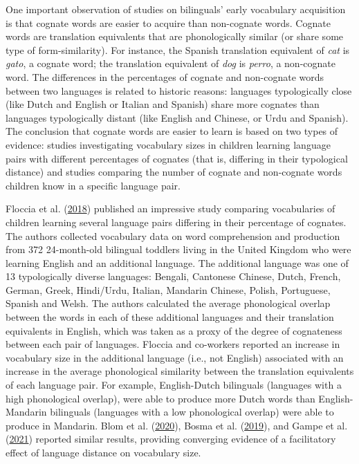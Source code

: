 \documentclass[
]{article}
\begin{document}
One important observation of studies on bilinguals' early vocabulary
acquisition is that cognate words are easier to acquire than non-cognate
words. Cognate words are translation equivalents that are phonologically
similar (or share some type of form-similarity). For instance, the
Spanish translation equivalent of \emph{cat} is \emph{gato}, a cognate
word; the translation equivalent of \emph{dog} is \emph{perro}, a
non-cognate word. The differences in the percentages of cognate and
non-cognate words between two languages is related to historic reasons:
languages typologically close (like Dutch and English or Italian and
Spanish) share more cognates than languages typologically distant (like
English and Chinese, or Urdu and Spanish). The conclusion that cognate
words are easier to learn is based on two types of evidence: studies
investigating vocabulary sizes in children learning language pairs with
different percentages of cognates (that is, differing in their
typological distance) and studies comparing the number of cognate and
non-cognate words children know in a specific language pair.

Floccia et al. (\protect\hyperlink{ref-floccia2018introduction}{2018})
published an impressive study comparing vocabularies of children
learning several language pairs differing in their percentage of
cognates. The authors collected vocabulary data on word comprehension
and production from 372 24-month-old bilingual toddlers living in the
United Kingdom who were learning English and an additional language. The
additional language was one of 13 typologically diverse languages:
Bengali, Cantonese Chinese, Dutch, French, German, Greek, Hindi/Urdu,
Italian, Mandarin Chinese, Polish, Portuguese, Spanish and Welsh. The
authors calculated the average phonological overlap between the words in
each of these additional languages and their translation equivalents in
English, which was taken as a proxy of the degree of cognateness between
each pair of languages. Floccia and co-workers reported an increase in
vocabulary size in the additional language (i.e., not English)
associated with an increase in the average phonological similarity
between the translation equivalents of each language pair. For example,
English-Dutch bilinguals (languages with a high phonological overlap),
were able to produce more Dutch words than English-Mandarin bilinguals
(languages with a low phonological overlap) were able to produce in
Mandarin. Blom et al.
(\protect\hyperlink{ref-blom2020crosslanguage}{2020}), Bosma et al.
(\protect\hyperlink{ref-bosma2019longitudinal}{2019}), and Gampe et al.
(\protect\hyperlink{ref-gampe2021does}{2021}) reported similar results,
providing converging evidence of a facilitatory effect of language
distance on vocabulary size.
\end{document}
